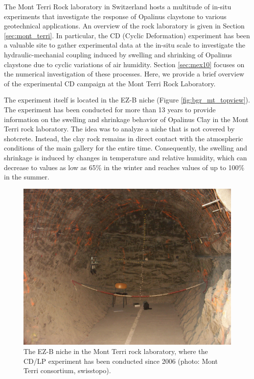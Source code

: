 The Mont Terri Rock laboratory in Switzerland hosts a multitude of in-situ experiments that investigate the response of Opalinus claystone to various geotechnical applications. An overview of the rock laboratory is given in Section \ref{sec:mont_terri}. In particular, the CD (Cyclic Deformation) experiment has been a valuable site to gather experimental data at the in-situ scale to investigate the hydraulic-mechanial coupling induced by swelling and shrinking of Opalinus claystone due to cyclic variations of air humidity. Section \ref{sec:mex10} focuses on the numerical investigation of these processes. Here, we provide a brief overview of the experimental CD campaign at the Mont Terri Rock Laboratory. 

The experiment itself is located in the EZ-B niche (Figure \ref{fig:bgr_mt_topview}). The experiment has been conducted for more than 13 years to provide information on the swelling and shrinkage behavior of Opalinus Clay in the Mont Terri rock laboratory. The idea was to analyze a niche that is not covered by shotcrete. Instead, the clay rock remains in direct contact with the atmospheric conditions of the main gallery for the entire time. Consequently, the swelling and shrinkage is induced by changes in temperature and relative humidity, which can decrease to values as low as 65\% in the winter and reaches values of up to 100\% in the summer. 

\begin{figure}[!ht]
\centering
\includegraphics[width=1\textwidth]{./figures/bgr_CD_experiment.jpg}
\caption{The EZ-B niche in the Mont Terri rock laboratory, where the CD/LP experiment has been conducted since 2006 (photo: Mont Terri consortium, swisstopo).}
\label{fig:bgr_CD_experiment}
\end{figure}

